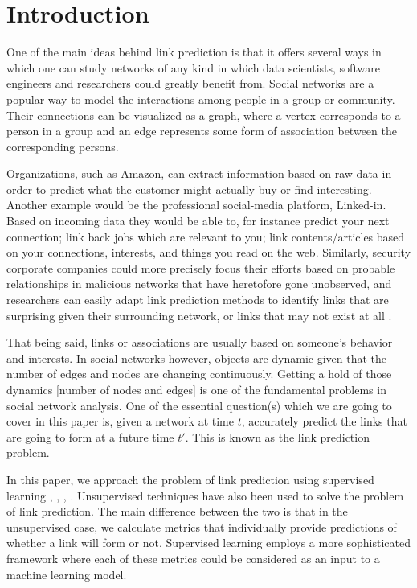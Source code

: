 \documentclass{acm_proc_article-sp}
\begin{document}


\section{Introduction}

One of the main ideas behind link prediction is that it offers several ways in which one can study networks of any kind in which data scientists, software engineers and researchers could greatly benefit from. Social networks are a popular way to model the interactions among people in a group or community. Their connections can be visualized as a graph, where a vertex corresponds to a person in a group and an edge represents some form of association between the corresponding persons.

Organizations, such as Amazon, can extract information based on raw data in order to predict what the customer might actually buy or find interesting. Another example would be the professional social-media platform, Linked-in.  Based on incoming data they would be able to, for instance predict your next connection; link back jobs which are relevant to you; link contents/articles based on your connections, interests, and things you read on the web. Similarly, security corporate companies could more precisely focus their efforts based on probable relationships in malicious networks that have heretofore gone unobserved, and researchers can easily adapt link prediction methods to identify links that are surprising given their surrounding network, or links that may not exist at all \cite{Lichtenwalter:2010:NPM:1835804.1835837}. 

That being said, links or associations are usually based on someone's behavior and interests. In social networks however, objects are dynamic given that the number of edges and nodes are changing continuously. Getting a hold of those dynamics [number of nodes and edges] is one of the fundamental problems in social network analysis. One of the essential question(s) which we are going to cover in this paper is, given a network at time $t$, accurately predict the links that are going to form at a future time $t'$. This is known as the link prediction problem.

In this paper, we approach the problem of link prediction using supervised learning \cite{Fire2013}, \cite{Hasan06linkprediction}, \cite{Lichtenwalter:2010:NPM:1835804.1835837}, \cite{Wang:2007:LPM:1441428.1442084}. Unsupervised techniques have also been used to solve the problem of link prediction. The main difference between the two is that in the unsupervised case, we calculate metrics that individually provide predictions of whether a link will form or not. Supervised learning employs a more sophisticated framework where each of these metrics could be considered as an input to a machine learning model.
\end{document}
